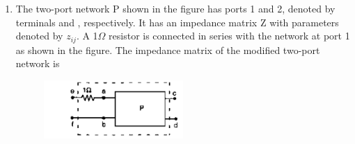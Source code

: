 \documentclass[12pt]{article}
\theoremstyle{remark}
\begin{document}
\begin{enumerate}
\item The two-port network P shown in the figure has ports 1 and 2, denoted by terminals  and , respectively. It has an impedance matrix Z with parameters denoted by $z_{ij}$. A 1$\Omega$ resistor is connected in series with the network at port 1 as shown in the figure. The impedance matrix of the modified two-port network  is
\begin{figure}[H]
    \centering
    \includegraphics[width=0.5\textwidth]{Figs/Q34.png}
    \caption{}
    \label{fig:1.23}
\end{figure}
\begin{enumerate}
\end{enumerate}
\hfill{}


\end{enumerate}
\end{document}
